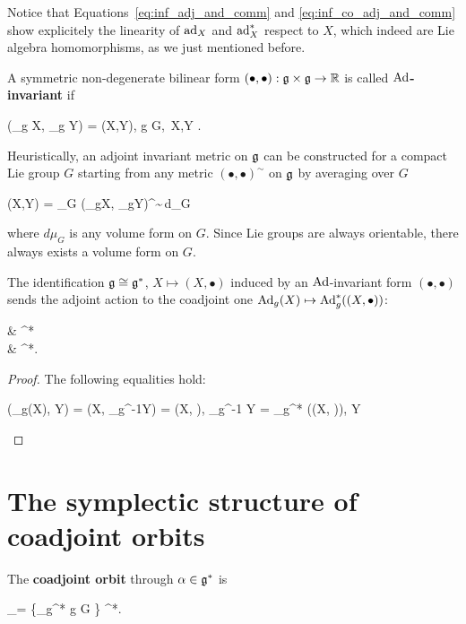 \documentclass[main.tex]{subfiles}
\begin{document}
Notice that Equations~\eqref{eq:inf_adj_and_comm} and \eqref{eq:inf_co_adj_and_comm} show explicitely the linearity of $\operatorname{ad}_X$ and $\operatorname{ad}^*_X$ respect to $X$, which indeed are Lie algebra homomorphisms, as we just mentioned before. 

\begin{definition}
	A symmetric non-degenerate bilinear form $(\bullet,\bullet) : \mathfrak g \times \mathfrak g \to \mathbb{R}$ is called \textbf{$\operatorname{Ad}$-invariant} if
	\begin{eqalign}
		(\Ad_g X, \Ad_g Y) = (X,Y), \quad \forall g \in G,\, \forall X,Y \in \lalg.
	\end{eqalign}
\end{definition}

\begin{remark}
	Heuristically, an adjoint invariant metric on $\mathfrak g$ can be constructed for a compact Lie group $G$ starting from any metric $(\bullet,\bullet)^\sim$ on $\mathfrak g$ by averaging over $G$
	\begin{eqalign}
		(X,Y) = \int_G (\Ad_gX, \Ad_gY)^\sim\,d\mu_G
	\end{eqalign}
	where $d\mu_G$ is any volume form on $G$. Since Lie groups are always orientable, there always exists a volume form on $G$.
\end{remark} 

\begin{proposition}
\label{prop:ad_to_coad_adinvariant}
	The identification $\mathfrak g \overset{}{\cong} \mathfrak g^*$, $X\mapsto (X,\bullet)$ induced by an $\operatorname{Ad}$-invariant form $(\bullet,\bullet)$ sends the adjoint action to the coadjoint one $\operatorname{Ad}_g(X) \mapsto \operatorname{Ad}^*_g((X, \bullet))$:
	\begin{diagram}
		\lalg {}  \& \lalg^* \arrow{d}{\Ad^*_g}\\
		\lalg {} \& \lalg^*.
	\end{diagram}
\end{proposition}
\begin{proof}
	The following equalities hold:
	\begin{eqalign}
		(\Ad_g(X), Y) = (X, \Ad_{g^{-1}}Y) = \langle (X, \bullet), \Ad_{g^{-1}} Y \rangle = \langle \Ad_g^* ((X, \bullet)), Y \rangle
	\end{eqalign}
\end{proof}

\section{The symplectic structure of coadjoint orbits}
\begin{definition}
	The \textbf{coadjoint orbit} through $\alpha \in \mathfrak g^*$ is
	\begin{eqalign}
		\Omega_\alpha = \{\Ad_g^* \alpha \suchthat g \in G \} \subseteq \lalg^*.
	\end{eqalign}
\end{definition}
\end{document}
